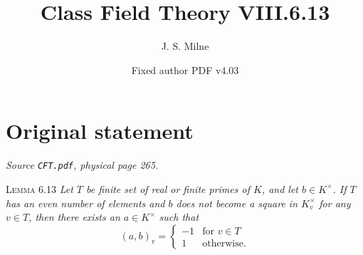\documentclass[11pt,a4paper]{article}
\title{Class Field Theory VIII.6.13}
\author{J. S. Milne}
\date{Fixed author PDF v4.03}
\begin{document}
\maketitle
\section*{Original statement}
\noindent\emph{Source \texttt{CFT.pdf}, physical page 265.}\par\medskip
\noindent\textsc{Lemma 6.13}
\emph{Let $T$ be finite set of real or finite primes of $K$, and let
$b\in K^\times$. If $T$ has an even number of elements and $b$ does not
become a square in $K_v^\times$ for any $v\in T$, then there exists an
$a\in K^\times$ such that}
\[
(a,b)_v =
\begin{cases}
-1 & \text{for }v\in T\\
 1 & \text{otherwise.}
\end{cases}
\]
\end{document}
